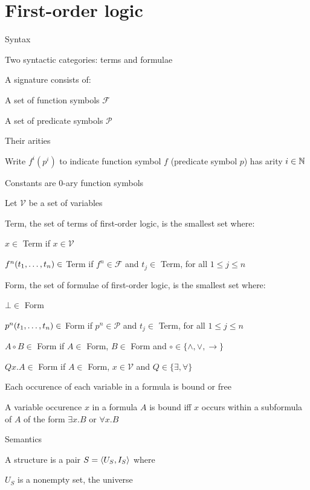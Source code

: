 \section{First-order logic}
\enumstart
	\item Syntax
	\enumstart
		\item Two syntactic categories: terms and formulae
		\item A signature consists of:
		\enumstart
			\item A set of function symbols $\mathcal{F}$
			\item A set of predicate symbols $\mathcal{P}$
			\item Their arities
			\item Write $f^i (p^i)$ to indicate function symbol $f$ (predicate symbol $p$) has arity $i \in \mathbb{N}$
			\item Constants are 0-ary function symbols
		\enumend
		\item Let $\mathcal{V}$ be a set of variables
		\item Term, the set of terms of first-order logic, is the smallest set where:
		\enumstart
			\item $x \in$ Term if $x \in \mathcal{V}$
			\item $f^n(t_1, \mathellipsis, t_n) \in$ Term if $f^n \in \mathcal{F}$ and $t_j \in$ Term, for all $1 \le j \le n$
		\enumend
		\item Form, the set of formulae of first-order logic, is the smallest set where:
		\enumstart
			\item $\bot \in$ Form
			\item $p^n(t_1, \mathellipsis, t_n) \in$ Form if $p^n \in \mathcal{P}$ and $t_j \in$ Term, for all $1 \le j \le n$
			\item $A \circ B \in$ Form if $A \in$ Form, $B \in$ Form and $\circ \in \{\land, \lor, \rightarrow\}$
			\item $Qx.A \in$ Form if $A \in$ Form, $x \in \mathcal{V}$ and $Q \in \{\exists, \forall \}$
		\enumend
		\item Each occurence of each variable in a formula is bound or free
		\enumstart
			\item A variable occurence $x$ in a formula $A$ is bound iff $x$ occurs within a subformula of $A$ of the form $\exists x.B$ or $\forall x.B$
		\enumend
	\enumend
	\item Semantics
	\enumstart
		\item A structure is a pair $S = \langle U_S, I_S \rangle$ where
		\enumstart
			\item $U_S$ is a nonempty set, the universe
